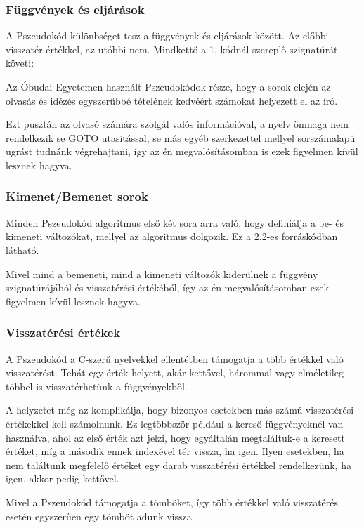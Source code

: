 \subsubsection{Függvények és eljárások}

A Pszeudokód különbséget tesz a függvények és eljárások között. Az előbbi visszatér értékkel, az utóbbi nem. Mindkettő a 1. kódnál szereplő szignatúrát követi:

Az Óbudai Egyetemen használt Pszeudokódok része, hogy a sorok elején az olvasás és idézés egyszerűbbé tételének kedvéért számokat helyezett el az író.

Ezt pusztán az olvasó számára szolgál valós információval, a nyelv önmaga nem rendelkezik se GOTO utasítással, se más egyéb szerkezettel mellyel sorszámalapú ugrást tudnánk végrehajtani, így az én megvalósításomban is ezek figyelmen kívül lesznek hagyva.

\subsubsection{Kimenet/Bemenet sorok}

Minden Pszeudokód algoritmus első két sora arra való, hogy definiálja a be- és kimeneti változókat, mellyel az algoritmus dolgozik. Ez a 2.2-es forráskódban látható.

Mivel mind a bemeneti, mind a kimeneti változók kiderülnek a függvény szignatúrájából és visszatérési értékéből, így az én megvalósításomban ezek figyelmen kívül lesznek hagyva.

\subsubsection{Visszatérési értékek}

A Pszeudokód a C-szerű nyelvekkel ellentétben támogatja a több értékkel való visszatérést. Tehát egy érték helyett, akár kettővel, hárommal vagy elméletileg többel is visszatérhetünk a függvényekből.

A helyzetet még az komplikálja, hogy bizonyos esetekben más számú visszatérési értékekkel kell számolnunk. Ez legtöbbször például a kereső függvényeknél van használva, ahol az első érték azt jelzi, hogy egyáltalán megtaláltuk-e a keresett értéket, míg a második ennek indexével tér vissza, ha igen. Ilyen esetekben, ha nem találtunk megfelelő értéket egy darab visszatérési értékkel rendelkezünk, ha igen, akkor pedig kettővel.

Mivel a Pszeudokód támogatja a tömböket, így több értékkel való visszatérés esetén egyszerűen egy tömböt adunk vissza.